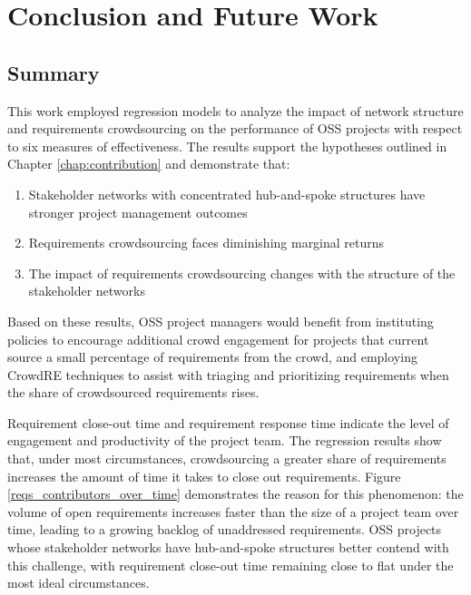 \doublespacing
\chapter{Conclusion and Future Work} \label{chap:conclusion}

\section{Summary}

This work employed regression models to analyze the impact of network structure and requirements crowdsourcing on the performance of OSS projects with respect to six measures of effectiveness. The results support the hypotheses outlined in Chapter \ref{chap:contribution} and demonstrate that:
\begin{enumerate}
    \item Stakeholder networks with concentrated hub-and-spoke structures have stronger project management outcomes
    \item Requirements crowdsourcing faces diminishing marginal returns
    \item The impact of requirements crowdsourcing changes with the structure of the stakeholder networks
\end{enumerate}

Based on these results, OSS project managers would benefit from instituting policies to encourage additional crowd engagement for projects that current source a small percentage of requirements from the crowd, and employing CrowdRE techniques to assist with triaging and prioritizing requirements when the share of crowdsourced requirements rises.

Requirement close-out time and requirement response time indicate the level of engagement and productivity of the project team. The regression results show that, under most circumstances, crowdsourcing a greater share of requirements increases the amount of time it takes to close out requirements. Figure \ref{reqs_contributors_over_time} demonstrates the reason for this phenomenon: the volume of open requirements increases faster than the size of a project team over time, leading to a growing backlog of unaddressed requirements. OSS projects whose stakeholder networks have hub-and-spoke structures better contend with this challenge, with requirement close-out time remaining close to flat under the most ideal circumstances.

